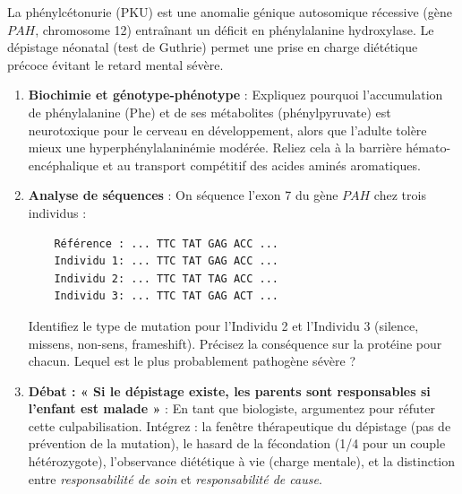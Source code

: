 \documentclass[11pt]{article}
\begin{document}
\begin{exercice}
La phénylcétonurie (PKU) est une anomalie génique autosomique récessive (gène $PAH$, chromosome 12) entraînant un déficit en phénylalanine hydroxylase. Le dépistage néonatal (test de Guthrie) permet une prise en charge diététique précoce évitant le retard mental sévère.

\begin{enumerate}
    \item \textbf{Biochimie et génotype-phénotype} : Expliquez pourquoi l'accumulation de phénylalanine (Phe) et de ses métabolites (phénylpyruvate) est neurotoxique pour le cerveau en développement, alors que l'adulte tolère mieux une hyperphénylalaninémie modérée. Reliez cela à la barrière hémato-encéphalique et au transport compétitif des acides aminés aromatiques.
    \item \textbf{Analyse de séquences} : On séquence l'exon 7 du gène $PAH$ chez trois individus : 
    \begin{verbatim}
    Référence : ... TTC TAT GAG ACC ...
    Individu 1: ... TTC TAT GAG ACC ...
    Individu 2: ... TTC TAT TAG ACC ...
    Individu 3: ... TTC TAT GAG ACT ...
    \end{verbatim}
    Identifiez le type de mutation pour l'Individu 2 et l'Individu 3 (silence, missens, non-sens, frameshift). Précisez la conséquence sur la protéine pour chacun. Lequel est le plus probablement pathogène sévère ?
    \item \textbf{Débat : « Si le dépistage existe, les parents sont responsables si l'enfant est malade »} : En tant que biologiste, argumentez pour réfuter cette culpabilisation. Intégrez : la fenêtre thérapeutique du dépistage (pas de prévention de la mutation), le hasard de la fécondation (1/4 pour un couple hétérozygote), l'observance diététique à vie (charge mentale), et la distinction entre \textit{responsabilité de soin} et \textit{responsabilité de cause}.
\end{enumerate}
\end{exercice}
\end{document}
